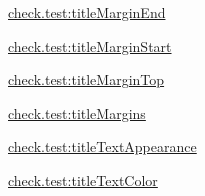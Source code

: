 {\ttfamily \hyperlink{classcheck_1_1test_1_1_r_1_1styleable_a17f1cea527896f8c82a64142d730f2bc}{check.\+test\+:title\+Margin\+End}}

{\ttfamily \hyperlink{classcheck_1_1test_1_1_r_1_1styleable_a4a55fbefdcf687934e2c57f3a12cfb1d}{check.\+test\+:title\+Margin\+Start}}

{\ttfamily \hyperlink{classcheck_1_1test_1_1_r_1_1styleable_a90b959cc7186d99612ffd6e5a1ded83b}{check.\+test\+:title\+Margin\+Top}}

{\ttfamily \hyperlink{classcheck_1_1test_1_1_r_1_1styleable_a198e72fff825b1e6049c5dbbb9265945}{check.\+test\+:title\+Margins}}

{\ttfamily \hyperlink{classcheck_1_1test_1_1_r_1_1styleable_a57757c8f75dedaa99dff594776088620}{check.\+test\+:title\+Text\+Appearance}}

{\ttfamily \hyperlink{classcheck_1_1test_1_1_r_1_1styleable_ad2cf34c85cd9f2275558a3082471052a}{check.\+test\+:title\+Text\+Color}}


